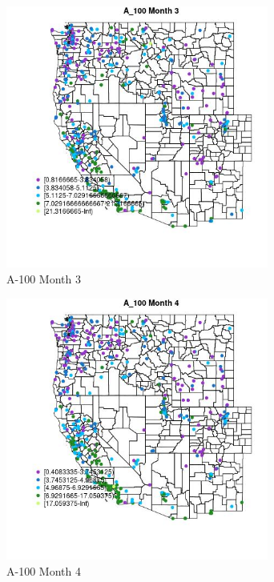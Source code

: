 \begin{figure} 
\centering  
\includegraphics[width=0.77\textwidth]{Code_Outputs/ML_input_report_ML_input_PM25_Step5_part_d_de_duplicated_aves_ML_input_MapObsMo3A_100.jpg} 
\caption{\label{fig:ML_input_report_ML_input_PM25_Step5_part_d_de_duplicated_aves_ML_inputMapObsMo3A_100}A-100 Month 3} 
\end{figure} 
 

\begin{figure} 
\centering  
\includegraphics[width=0.77\textwidth]{Code_Outputs/ML_input_report_ML_input_PM25_Step5_part_d_de_duplicated_aves_ML_input_MapObsMo4A_100.jpg} 
\caption{\label{fig:ML_input_report_ML_input_PM25_Step5_part_d_de_duplicated_aves_ML_inputMapObsMo4A_100}A-100 Month 4} 
\end{figure} 
 


